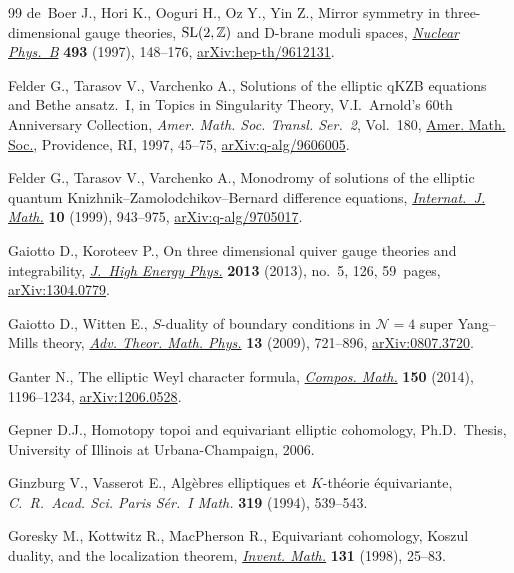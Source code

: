 \documentclass[10pt,a4paper]{amsart}
\numberwithin{equation}{section}
\begin{document}
\begin{thebibliography}{99}
de~Boer J., Hori K., Ooguri H., Oz Y., Yin Z., Mirror symmetry in
 three-dimensional gauge theories, {${\rm SL}(2,{\mathbb Z})$} and {D}-brane
 moduli spaces, \href{https://doi.org/10.1016/S0550-3213(97)00115-6}{\textit{Nuclear Phys.~B}} \textbf{493} (1997), 148--176,
 \href{https://arxiv.org/abs/hep-th/9612131}{arXiv:hep-th/9612131}.

Felder G., Tarasov V., Varchenko A., Solutions of the elliptic q{KZB} equations
 and {B}ethe ansatz.~{I}, in Topics in Singularity Theory, V.I.~Arnold's 60th
 Anniversary Collection, \textit{Amer. Math. Soc. Transl. Ser.~2}, Vol.~180,
 \href{https://doi.org/10.1090/trans2/180/04}{Amer. Math. Soc.}, Providence, RI, 1997, 45--75, \href{https://arxiv.org/abs/q-alg/9606005}{arXiv:q-alg/9606005}.

Felder G., Tarasov V., Varchenko A., Monodromy of solutions of the elliptic
 quantum {K}nizhnik--{Z}amolodchikov--{B}ernard difference equations,
 \href{https://doi.org/10.1142/S0129167X99000410}{\textit{Internat.~J. Math.}} \textbf{10} (1999), 943--975,
 \href{https://arxiv.org/abs/q-alg/9705017}{arXiv:q-alg/9705017}.

Gaiotto D., Koroteev P., On three dimensional quiver gauge theories and
 integrability, \href{https://doi.org/10.1007/JHEP05(2013)126}{\textit{J.~High Energy Phys.}} \textbf{2013} (2013), no.~5,
 126, 59~pages, \href{https://arxiv.org/abs/1304.0779}{arXiv:1304.0779}.

Gaiotto D., Witten E., {$S$}-duality of boundary conditions in {${\mathcal
 N}=4$} super {Y}ang--{M}ills theory, \href{https://doi.org/10.4310/ATMP.2009.v13.n3.a5}{\textit{Adv. Theor. Math. Phys.}}
 \textbf{13} (2009), 721--896, \href{https://arxiv.org/abs/0807.3720}{arXiv:0807.3720}.

Ganter N., The elliptic {W}eyl character formula, \href{https://doi.org/10.1112/S0010437X1300777X}{\textit{Compos. Math.}}
 \textbf{150} (2014), 1196--1234, \href{https://arxiv.org/abs/1206.0528}{arXiv:1206.0528}.

Gepner D.J., Homotopy topoi and equivariant elliptic cohomology, Ph.D.~Thesis,
 {U}niversity of Illinois at Urbana-Champaign, 2006.

Ginzburg V., Vasserot E., Alg\`ebres elliptiques et {$K$}-th\'{e}orie
 \'{e}quivariante, \textit{C.~R.~Acad. Sci. Paris S\'{e}r.~I Math.}
 \textbf{319} (1994), 539--543.

Goresky M., Kottwitz R., MacPherson R., Equivariant cohomology, {K}oszul
 duality, and the localization theorem, \href{https://doi.org/10.1007/s002220050197}{\textit{Invent. Math.}} \textbf{131}
 (1998), 25--83.


\end{thebibliography}
\end{document}

